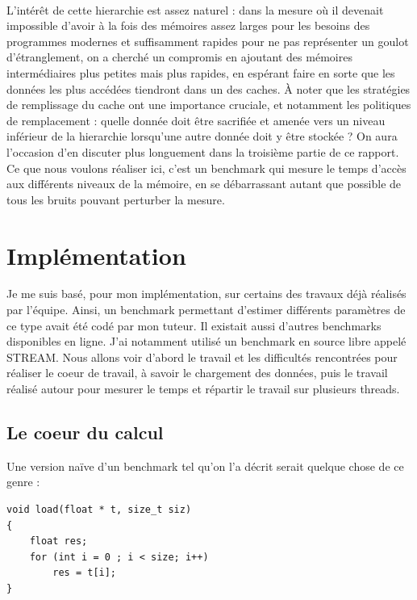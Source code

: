 \documentclass{report}
\begin{document}
\\L'intérêt de cette hierarchie est assez naturel : dans la mesure où il devenait impossible d'avoir
à la fois des mémoires assez larges pour les besoins des programmes modernes et suffisamment
rapides pour ne pas représenter un goulot d'étranglement, on a cherché un compromis en ajoutant
des mémoires intermédiaires plus petites mais plus rapides, en espérant faire en sorte que les données
les plus accédées tiendront dans un des caches. À noter que les stratégies de remplissage du cache ont
une importance cruciale, et notamment les politiques de remplacement : quelle donnée doit être 
sacrifiée et amenée vers un niveau inférieur de la hierarchie lorsqu'une autre donnée doit y être
stockée ? On aura l'occasion d'en discuter plus longuement dans la troisième partie de ce rapport.
\\Ce que nous voulons réaliser ici, c'est un benchmark qui mesure le temps d'accès aux différents 
niveaux de la mémoire, en se débarrassant autant que possible de tous les bruits pouvant perturber
la mesure.

\section{Implémentation}
Je me suis basé, pour mon implémentation, sur certains des travaux déjà réalisés par l'équipe.
Ainsi, un benchmark permettant d'estimer différents paramètres de ce type avait été codé par
mon tuteur. Il existait aussi d'autres benchmarks disponibles en ligne. J'ai notamment utilisé
un benchmark en source libre appelé STREAM. Nous allons voir d'abord le travail et les difficultés
rencontrées pour réaliser le coeur de travail, à savoir le chargement des données, puis le travail 
réalisé autour pour mesurer le temps et répartir le travail sur plusieurs threads.
\subsection{Le coeur du calcul}

Une version naïve d'un benchmark tel qu'on l'a décrit serait quelque chose de ce genre :

\begin{lstlisting}
void load(float * t, size_t siz)
{
    float res;
    for (int i = 0 ; i < size; i++)
        res = t[i]; 
}
\end{lstlisting}
\end{document}

